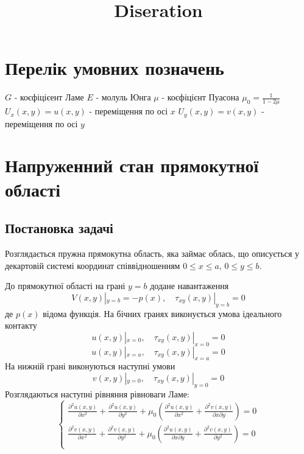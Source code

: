 \documentclass[a4paper,14pt]{extarticle}
\title{Diseration}
\author{}
\date{}
\numberwithin{equation}{section}
\begin{document}
\maketitle

\section*{\centering Перелік умовних позначень}
$G$ - коєфіцієент Ламе \newline
$E$ - молуль Юнга \newline
$\mu$ - коєфіцієнт Пуасона \newline
$\mu_0 = \frac{1}{1 - 2\mu}$ \newline
$U_x(x,y) = u(x,y)$ - переміщення по осі $x$ \newline
$U_y(x,y) = v(x,y)$ - переміщення по осі $y$

\section{Напруженний стан прямокутної області}
\subsection{Постановка задачі}
Розглядається пружна прямокутна область, яка займає облась,
що описується у декартовій системі координат співвідношенням $0 \le x \le a$, $0 \le y \le b$.

До прямокутної області на грані $y=b$ додане навантаження
\begin{equation}
    V(x, y) |_{y=b} = -p(x), \quad  \tau_{xy}(x,y) |_{y=b} =0
\end{equation}
де $p(x)$ відома функція.
На бічних гранях виконується умова ідеального контакту
\begin{equation}
    u(x,y) |_{x=0}, \quad \tau_{xy}(x,y) |_{x=0} =0
\end{equation}
\begin{equation}
    u(x,y) |_{x=a}, \quad \tau_{xy}(x,y) |_{x=a} =0
\end{equation}
На нижній грані виконуються наступні умови
\begin{equation}
    v(x,y) |_{y=0}, \quad \tau_{xy}(x,y) |_{y=0} =0
\end{equation}
Розглядаються наступні рівняння рівноваги Ламе:
\begin{equation}\label{lame_1}
    \begin{cases}
        \frac{\partial^2 u(x,y)}{\partial x^2} + \frac{\partial^2 u(x,y)}{\partial y^2} + \mu_0 (\frac{\partial^2 u(x,y)}{\partial x^2} + \frac{\partial^2 v(x,y)}{\partial x\partial y}) = 0 \\
        \frac{\partial^2 v(x,y)}{\partial x^2} + \frac{\partial^2 v(x,y)}{\partial y^2} + \mu_0 (\frac{\partial^2 u(x,y)}{\partial x \partial y} + \frac{\partial^2 v(x,y)}{\partial y^2}) = 0 \\
    \end{cases}
\end{equation}
\end{document}
